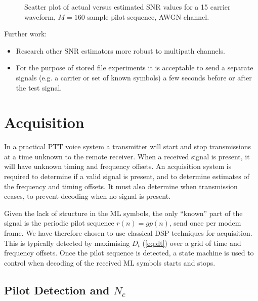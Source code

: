 \documentclass{article}
\begin{document}
\begin{figure}[H]
\caption{Scatter plot of actual versus estimated SNR values for a 15 carrier waveform, $M=160$ sample pilot sequence, AWGN channel.}
\label{fig:est_snr}
\begin{center}

\end{center}
\end{figure}

Further work:
\begin{itemize}
\item Research other SNR estimators more robust to multipath channels.
\item For the purpose of stored file experiments it is acceptable to send a separate signals (e.g. a carrier or set of known symbols) a few seconds before or after the test signal.
\end{itemize}

\section{Acquisition}

In a practical PTT voice system a transmitter will start and stop transmissions at a time unknown to the remote receiver.  When a received signal is present, it will have unknown timing and frequency offsets. An acquisition system is required to determine if a valid signal is present, and to determine estimates of the frequency and timing offsets.  It must also determine when transmission ceases, to prevent decoding when no signal is present.
 
Given the lack of structure in the ML symbols, the only ``known'' part of the signal is the periodic pilot sequence $r(n)=gp(n)$, send once per modem frame.  We have therefore chosen to use classical DSP techniques for acquisition. This is typically detected by maximising $D_t$ (\ref{eq:dt}) over a grid of time and frequency offsets. Once the pilot sequence is detected, a state machine is used to control when decoding of the received ML symbols starts and stops.

\subsection{Pilot Detection and $N_c$}
\end{document}

